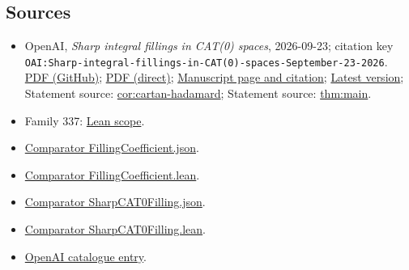 \documentclass[11pt]{article}
\begin{document}
\subsection{Sources}
\begin{itemize}
\item OpenAI, \emph{Sharp integral fillings in CAT(0) spaces}, 2026-09-23; citation key \texttt{OAI:Sharp-integral-fillings-in-CAT(0)-spaces-September-23-2026}. \href{https://github.com/openai/math/blob/adc7f1241b42e322a6451854ab7e4b4c146bf78a/preprints/Sharp-integral-fillings-in-CAT\%280\%29-spaces-September-23-2026/paper.pdf}{PDF (GitHub)}; \href{https://github.com/openai/math/raw/adc7f1241b42e322a6451854ab7e4b4c146bf78a/preprints/Sharp-integral-fillings-in-CAT\%280\%29-spaces-September-23-2026/paper.pdf}{PDF (direct)}; \href{https://github.com/openai/math/blob/adc7f1241b42e322a6451854ab7e4b4c146bf78a/preprints/Sharp-integral-fillings-in-CAT\%280\%29-spaces-September-23-2026/README.md}{Manuscript page and citation}; \href{https://github.com/openai/math/blob/main/preprints/Sharp-integral-fillings-in-CAT\%280\%29-spaces-September-23-2026/paper.pdf}{Latest version}; Statement source: \href{https://github.com/openai/math/blob/adc7f1241b42e322a6451854ab7e4b4c146bf78a/preprints/Sharp-integral-fillings-in-CAT\%280\%29-spaces-September-23-2026/build/sections/01-introduction.tex\#L57}{cor:cartan-hadamard}; Statement source: \href{https://github.com/openai/math/blob/adc7f1241b42e322a6451854ab7e4b4c146bf78a/preprints/Sharp-integral-fillings-in-CAT\%280\%29-spaces-September-23-2026/build/sections/01-introduction.tex\#L26}{thm:main}.
\item Family 337: \href{https://github.com/openai/math/blob/adc7f1241b42e322a6451854ab7e4b4c146bf78a/lean/docs/337.md}{Lean scope}.
\item \href{https://github.com/openai/math/blob/adc7f1241b42e322a6451854ab7e4b4c146bf78a/lean/ComparatorChallenges/FillingCoefficient.json}{Comparator FillingCoefficient.json}.
\item \href{https://github.com/openai/math/blob/adc7f1241b42e322a6451854ab7e4b4c146bf78a/lean/ComparatorChallenges/FillingCoefficient.lean}{Comparator FillingCoefficient.lean}.
\item \href{https://github.com/openai/math/blob/adc7f1241b42e322a6451854ab7e4b4c146bf78a/lean/ComparatorChallenges/SharpCAT0Filling.json}{Comparator SharpCAT0Filling.json}.
\item \href{https://github.com/openai/math/blob/adc7f1241b42e322a6451854ab7e4b4c146bf78a/lean/ComparatorChallenges/SharpCAT0Filling.lean}{Comparator SharpCAT0Filling.lean}.
\item \href{https://github.com/openai/math/blob/adc7f1241b42e322a6451854ab7e4b4c146bf78a/CONTENTS.md}{OpenAI catalogue entry}.
\end{itemize}
\end{document}
